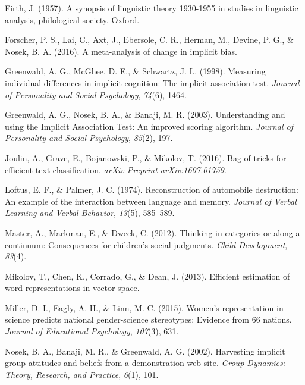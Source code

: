 \documentclass[man,floatsintext]{apa6}
\theoremstyle{definition}
\theoremstyle{definition}
\theoremstyle{definition}
\theoremstyle{remark}
\begin{document}
\hypertarget{ref-firth1957synopsis}{}
Firth, J. (1957). A synopsis of linguistic theory 1930-1955 in studies
in linguistic analysis, philological society. Oxford.

\hypertarget{ref-forscher2016meta}{}
Forscher, P. S., Lai, C., Axt, J., Ebersole, C. R., Herman, M., Devine,
P. G., \& Nosek, B. A. (2016). A meta-analysis of change in implicit
bias.

\hypertarget{ref-greenwald1998measuring}{}
Greenwald, A. G., McGhee, D. E., \& Schwartz, J. L. (1998). Measuring
individual differences in implicit cognition: The implicit association
test. \emph{Journal of Personality and Social Psychology}, \emph{74}(6),
1464.

\hypertarget{ref-greenwald2003understanding}{}
Greenwald, A. G., Nosek, B. A., \& Banaji, M. R. (2003). Understanding
and using the Implicit Association Test: An improved scoring algorithm.
\emph{Journal of Personality and Social Psychology}, \emph{85}(2), 197.

\hypertarget{ref-joulin2016bag}{}
Joulin, A., Grave, E., Bojanowski, P., \& Mikolov, T. (2016). Bag of
tricks for efficient text classification. \emph{arXiv Preprint
arXiv:1607.01759}.

\hypertarget{ref-loftus1974reconstruction}{}
Loftus, E. F., \& Palmer, J. C. (1974). Reconstruction of automobile
destruction: An example of the interaction between language and memory.
\emph{Journal of Verbal Learning and Verbal Behavior}, \emph{13}(5),
585--589.

\hypertarget{ref-master2012thinking}{}
Master, A., Markman, E., \& Dweck, C. (2012). Thinking in categories or
along a continuum: Consequences for children's social judgments.
\emph{Child Development}, \emph{83}(4).

\hypertarget{ref-mikolov2013efficient}{}
Mikolov, T., Chen, K., Corrado, G., \& Dean, J. (2013). Efficient
estimation of word representations in vector space.

\hypertarget{ref-miller2015women}{}
Miller, D. I., Eagly, A. H., \& Linn, M. C. (2015). Women's
representation in science predicts national gender-science stereotypes:
Evidence from 66 nations. \emph{Journal of Educational Psychology},
\emph{107}(3), 631.

\hypertarget{ref-nosek2002harvesting}{}
Nosek, B. A., Banaji, M. R., \& Greenwald, A. G. (2002). Harvesting
implicit group attitudes and beliefs from a demonstration web site.
\emph{Group Dynamics: Theory, Research, and Practice}, \emph{6}(1), 101.
\end{document}
